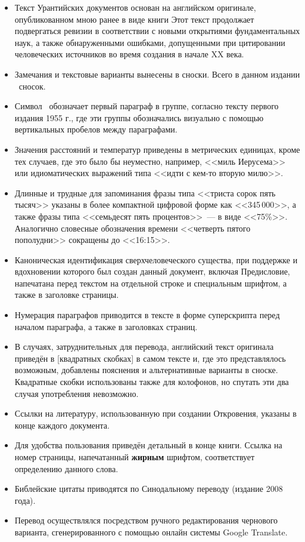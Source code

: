 \begin{itemize}
\item Текст Урантийских документов основан на английском оригинале, опубликованном мною ранее в виде книги
      Этот текст продолжает подвергаться ревизии в соответствии с новыми открытиями фундаментальных наук, а также обнаруженными
      ошибками, допущенными при цитировании человеческих источников во время создания
       в начале XX века.
\item Замечания и текстовые варианты вынесены в сноски. Всего в данном издании \totalnfnsts\ сносок.
\item Символ \pc\ обозначает первый параграф в группе, согласно тексту первого издания 1955 г., где эти группы обозначались визуально с помощью вертикальных пробелов между параграфами.
\item Значения расстояний и температур приведены в метрических единицах, кроме тех случаев, где это было бы неуместно,
      например, <<миль Иерусема>> или идиоматических выражений типа <<идти с кем-то вторую милю>>.
\item Длинные и трудные для запоминания фразы типа <<триста сорок пять тысяч>> указаны в более компактной цифровой
      форме как <<345\,000>>, а также фразы типа <<семьдесят пять процентов>>~--- в виде <<75\%>>.
      Аналогично словесные обозначения времени <<четверть пятого пополудни>> сокращены до <<16:15>>.
\item Каноническая идентификация сверхчеловеческого существа, при поддержке и вдохновении которого был создан данный документ,
      включая Предисловие, напечатана перед текстом на отдельной строке и специальным шрифтом, а также в заголовке страницы.
\item Нумерация параграфов приводится в тексте в форме суперскрипта перед началом параграфа, а также в заголовках страниц.
\item В случаях, затруднительных для перевода, английский текст оригинала приведён в
      [квадратных скобках] в самом тексте и, где это представлялось возможным,
      добавлены пояснения и альтернативные варианты в сноске.
      Квадратные скобки использованы также для колофонов, но спутать эти два случая употребления невозможно.
\item Ссылки на литературу, использованную при создании Откровения, указаны в конце каждого документа.
\item Для удобства пользования приведён детальный  в конце книги.
      Ссылка на номер страницы, напечатанный \textbf{жирным} шрифтом, соответствует определению данного слова.
\item Библейские цитаты приводятся по Синодальному переводу (издание 2008 года).
\item Перевод осуществлялся посредством ручного редактирования чернового варианта, сгенерированного с помощью онлайн системы
      Google Translate.
\end{itemize}

